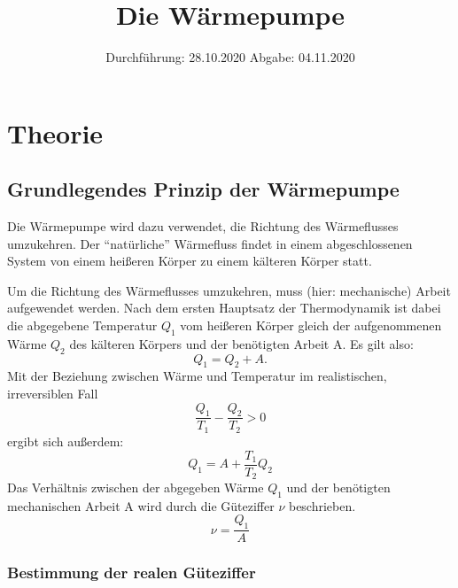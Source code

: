 

\subject{D206}
\title{Die Wärmepumpe}
\date{
    Durchführung: 28.10.2020
    \hspace{3em}
    Abgabe: 04.11.2020
}



\maketitle
\thispagestyle{empty}
\tableofcontents
\newpage

\section{Theorie} \label{sec:Theorie}

\subsection{Grundlegendes Prinzip der Wärmepumpe}

    Die Wärmepumpe wird dazu verwendet, die Richtung des Wärmeflusses umzukehren.
    Der \enquote{natürliche} Wärmefluss findet in einem abgeschlossenen System von einem heißeren Körper
    zu einem kälteren Körper statt.

    Um die Richtung des Wärmeflusses umzukehren, muss (hier: mechanische) Arbeit aufgewendet werden.
    Nach dem ersten Hauptsatz der Thermodynamik ist dabei die abgegebene Temperatur $Q_1$ vom heißeren Körper
    gleich der aufgenommenen Wärme $Q_2$ des kälteren Körpers und der benötigten Arbeit A.
    Es gilt also:
    \begin{equation}
        Q_1 = Q_2 + A .
    \end{equation}
    Mit der Beziehung zwischen Wärme und Temperatur im realistischen, irreversiblen Fall
    \begin{equation}
        \frac{Q_1}{T_1} - \frac{Q_2}{T_2} > 0
    \end{equation}
    ergibt sich außerdem:
    \begin{equation}
        Q_1 = A + \frac{T_1}{T_2} Q_2
    \end{equation}
    Das Verhältnis zwischen der abgegeben Wärme $Q_1$ und der benötigten mechanischen Arbeit A wird durch die Güteziffer $\nu$
    beschrieben.
    \begin{equation}
        \nu = \frac{Q_1}{A}
    \end{equation}

\subsubsection{Bestimmung der realen Güteziffer}

